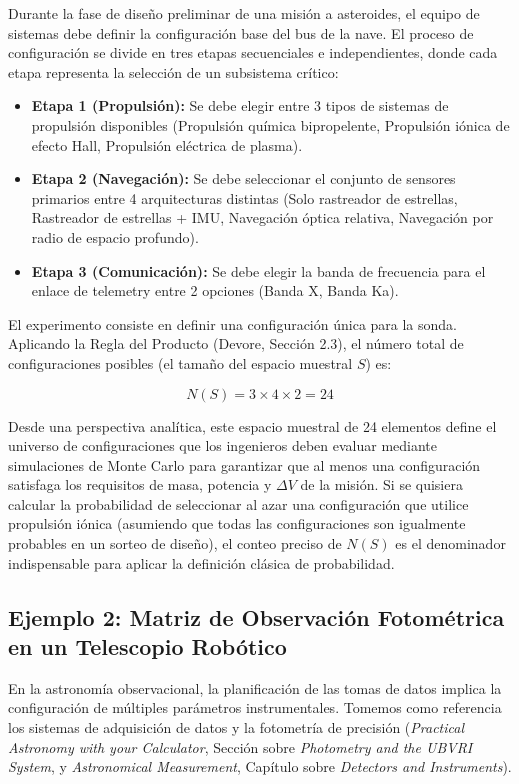 Durante la fase de diseño preliminar de una misión a asteroides, el equipo de sistemas debe definir la configuración base del bus de la nave. El proceso de configuración se divide en tres etapas secuenciales e independientes, donde cada etapa representa la selección de un subsistema crítico:
\begin{itemize}
    \item \textbf{Etapa 1 (Propulsión):} Se debe elegir entre 3 tipos de sistemas de propulsión disponibles (Propulsión química bipropelente, Propulsión iónica de efecto Hall, Propulsión eléctrica de plasma).
    \item \textbf{Etapa 2 (Navegación):} Se debe seleccionar el conjunto de sensores primarios entre 4 arquitecturas distintas (Solo rastreador de estrellas, Rastreador de estrellas + IMU, Navegación óptica relativa, Navegación por radio de espacio profundo).
    \item \textbf{Etapa 3 (Comunicación):} Se debe elegir la banda de frecuencia para el enlace de telemetry entre 2 opciones (Banda X, Banda Ka).
\end{itemize}

El experimento consiste en definir una configuración única para la sonda. Aplicando la Regla del Producto (Devore, Sección 2.3), el número total de configuraciones posibles (el tamaño del espacio muestral $S$) es:

$$ N(S) = 3 \times 4 \times 2 = 24 $$

Desde una perspectiva analítica, este espacio muestral de 24 elementos define el universo de configuraciones que los ingenieros deben evaluar mediante simulaciones de Monte Carlo para garantizar que al menos una configuración satisfaga los requisitos de masa, potencia y $\Delta V$ de la misión. Si se quisiera calcular la probabilidad de seleccionar al azar una configuración que utilice propulsión iónica (asumiendo que todas las configuraciones son igualmente probables en un sorteo de diseño), el conteo preciso de $N(S)$ es el denominador indispensable para aplicar la definición clásica de probabilidad.

\subsection{Ejemplo 2: Matriz de Observación Fotométrica en un Telescopio Robótico}

En la astronomía observacional, la planificación de las tomas de datos implica la configuración de múltiples parámetros instrumentales. Tomemos como referencia los sistemas de adquisición de datos y la fotometría de precisión (\textit{Practical Astronomy with your Calculator}, Sección sobre \textit{Photometry and the UBVRI System}, y \textit{Astronomical Measurement}, Capítulo sobre \textit{Detectors and Instruments}).

